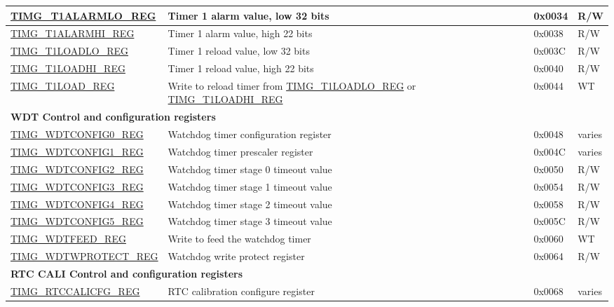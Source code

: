 \begin{longtable}{ | p{5.5cm} | p{7.5cm} | p{1.3cm} | p{1cm} | }
\hyperref[regdesc:TIMGTXALARMLOREG]{TIMG\_T1ALARMLO\_REG} & Timer 1 alarm value, low 32 bits & 0x0034 & R/W \\ \hline
\hyperref[regdesc:TIMGTXALARMHIREG]{TIMG\_T1ALARMHI\_REG} & Timer 1 alarm value, high 22 bits & 0x0038 & R/W \\ \hline
\hyperref[regdesc:TIMGTXLOADLOREG]{TIMG\_T1LOADLO\_REG} & Timer 1 reload value, low 32 bits & 0x003C & R/W \\ \hline
\hyperref[regdesc:TIMGTXLOADHIREG]{TIMG\_T1LOADHI\_REG} & Timer 1 reload value, high 22 bits & 0x0040 & R/W \\ \hline
\hyperref[regdesc:TIMGTXLOADREG]{TIMG\_T1LOAD\_REG} & Write to reload timer from \hyperref[regdesc:TIMGTXLOADLOREG]{TIMG\_T1LOADLO\_REG} or \hyperref[regdesc:TIMGTXLOADHIREG]{TIMG\_T1LOADHI\_REG} & 0x0044 & WT \\ \hline
\multicolumn{4}{|l|}{\textbf{WDT Control and configuration registers}} \\ \hline
\hyperref[regdesc:TIMGWDTCONFIG0REG]{TIMG\_WDTCONFIG0\_REG} & Watchdog timer configuration register & 0x0048 & varies \\ \hline
\hyperref[regdesc:TIMGWDTCONFIG1REG]{TIMG\_WDTCONFIG1\_REG} & Watchdog timer prescaler register & 0x004C & varies \\ \hline
\hyperref[regdesc:TIMGWDTCONFIG2REG]{TIMG\_WDTCONFIG2\_REG} & Watchdog timer stage 0 timeout value & 0x0050 & R/W \\ \hline
\hyperref[regdesc:TIMGWDTCONFIG3REG]{TIMG\_WDTCONFIG3\_REG} & Watchdog timer stage 1 timeout value & 0x0054 & R/W \\ \hline
\hyperref[regdesc:TIMGWDTCONFIG4REG]{TIMG\_WDTCONFIG4\_REG} & Watchdog timer stage 2 timeout value & 0x0058 & R/W \\ \hline
\hyperref[regdesc:TIMGWDTCONFIG5REG]{TIMG\_WDTCONFIG5\_REG} & Watchdog timer stage 3 timeout value & 0x005C & R/W \\ \hline
\hyperref[regdesc:TIMGWDTFEEDREG]{TIMG\_WDTFEED\_REG} & Write to feed the watchdog timer & 0x0060 & WT \\ \hline
\hyperref[regdesc:TIMGWDTWPROTECTREG]{TIMG\_WDTWPROTECT\_REG} & Watchdog write protect register & 0x0064 & R/W \\ \hline
\multicolumn{4}{|l|}{\textbf{RTC CALI Control and configuration registers}} \\ \hline
\hyperref[regdesc:TIMGRTCCALICFGREG]{TIMG\_RTCCALICFG\_REG} & RTC calibration configure register & 0x0068 & varies \\ \hline

\end{longtable}
